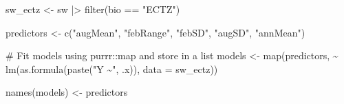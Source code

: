 \documentclass[
  letterpaper,
]{book}
\newenvironment{Shaded}{\begin{snugshade}}{\end{snugshade}}
\newcommand{\AttributeTok}[1]{\textcolor[rgb]{0.40,0.45,0.13}{#1}}
\newcommand{\CommentTok}[1]{\textcolor[rgb]{0.37,0.37,0.37}{#1}}
\newcommand{\FunctionTok}[1]{\textcolor[rgb]{0.28,0.35,0.67}{#1}}
\newcommand{\NormalTok}[1]{\textcolor[rgb]{0.00,0.23,0.31}{#1}}
\newcommand{\OtherTok}[1]{\textcolor[rgb]{0.00,0.23,0.31}{#1}}
\newcommand{\SpecialCharTok}[1]{\textcolor[rgb]{0.37,0.37,0.37}{#1}}
\newcommand{\StringTok}[1]{\textcolor[rgb]{0.13,0.47,0.30}{#1}}
\begin{document}
\begin{Shaded}
\begin{Highlighting}[]
\NormalTok{sw\_ectz }\OtherTok{\textless{}{-}}\NormalTok{ sw }\SpecialCharTok{|\textgreater{}} \FunctionTok{filter}\NormalTok{(bio }\SpecialCharTok{==} \StringTok{"ECTZ"}\NormalTok{)}

\NormalTok{predictors }\OtherTok{\textless{}{-}} \FunctionTok{c}\NormalTok{(}\StringTok{"augMean"}\NormalTok{, }\StringTok{"febRange"}\NormalTok{, }\StringTok{"febSD"}\NormalTok{, }\StringTok{"augSD"}\NormalTok{, }\StringTok{"annMean"}\NormalTok{)}

\CommentTok{\# Fit models using purrr::map and store in a list}
\NormalTok{models }\OtherTok{\textless{}{-}} \FunctionTok{map}\NormalTok{(predictors, }\SpecialCharTok{\textasciitilde{}} \FunctionTok{lm}\NormalTok{(}\FunctionTok{as.formula}\NormalTok{(}\FunctionTok{paste}\NormalTok{(}\StringTok{"Y \textasciitilde{}"}\NormalTok{, .x)),}
                               \AttributeTok{data =}\NormalTok{ sw\_ectz))}

\FunctionTok{names}\NormalTok{(models) }\OtherTok{\textless{}{-}}\NormalTok{ predictors}


\end{Highlighting}
\end{Shaded}
\end{document}

